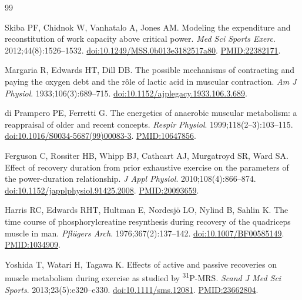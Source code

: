 \documentclass[11pt,a4paper]{article}
\begin{document}
\begin{thebibliography}{99}
\setlength{\itemsep}{2pt}

 Skiba PF, Chidnok W, Vanhatalo A, Jones AM. Modeling the expenditure and reconstitution
of work capacity above critical power. \emph{Med Sci Sports Exerc}. 2012;44(8):1526--1532.
\href{https://doi.org/10.1249/MSS.0b013e3182517a80}{doi:10.1249/MSS.0b013e3182517a80}.
\href{https://pubmed.ncbi.nlm.nih.gov/22382171/}{PMID:22382171}.

 Margaria R, Edwards HT, Dill DB. The possible mechanisms of contracting and paying
the oxygen debt and the r\^ole of lactic acid in muscular contraction. \emph{Am J Physiol}.
1933;106(3):689--715. \href{https://doi.org/10.1152/ajplegacy.1933.106.3.689}{doi:10.1152/ajplegacy.1933.106.3.689}.

 di Prampero PE, Ferretti G. The energetics of anaerobic muscular metabolism: a
reappraisal of older and recent concepts. \emph{Respir Physiol}. 1999;118(2--3):103--115.
\href{https://doi.org/10.1016/S0034-5687(99)00083-3}{doi:10.1016/S0034-5687(99)00083-3}.
\href{https://pubmed.ncbi.nlm.nih.gov/10647856/}{PMID:10647856}.

 Ferguson C, Rossiter HB, Whipp BJ, Cathcart AJ, Murgatroyd SR, Ward SA. Effect of
recovery duration from prior exhaustive exercise on the parameters of the power-duration relationship.
\emph{J Appl Physiol}. 2010;108(4):866--874.
\href{https://doi.org/10.1152/japplphysiol.91425.2008}{doi:10.1152/japplphysiol.91425.2008}.
\href{https://pubmed.ncbi.nlm.nih.gov/20093659/}{PMID:20093659}.

 Harris RC, Edwards RHT, Hultman E, Nordesj\"o LO, Nylind B, Sahlin K. The time course
of phosphorylcreatine resynthesis during recovery of the quadriceps muscle in man. \emph{Pfl\"ugers Arch}.
1976;367(2):137--142. \href{https://doi.org/10.1007/BF00585149}{doi:10.1007/BF00585149}.
\href{https://pubmed.ncbi.nlm.nih.gov/1034909/}{PMID:1034909}.

 Yoshida T, Watari H, Tagawa K. Effects of active and passive recoveries on muscle
metabolism during exercise as studied by \textsuperscript{31}P-MRS. \emph{Scand J Med Sci Sports}.
2013;23(5):e320--e330. \href{https://doi.org/10.1111/sms.12081}{doi:10.1111/sms.12081}.
\href{https://pubmed.ncbi.nlm.nih.gov/23662804/}{PMID:23662804}.


\end{thebibliography}
\end{document}
